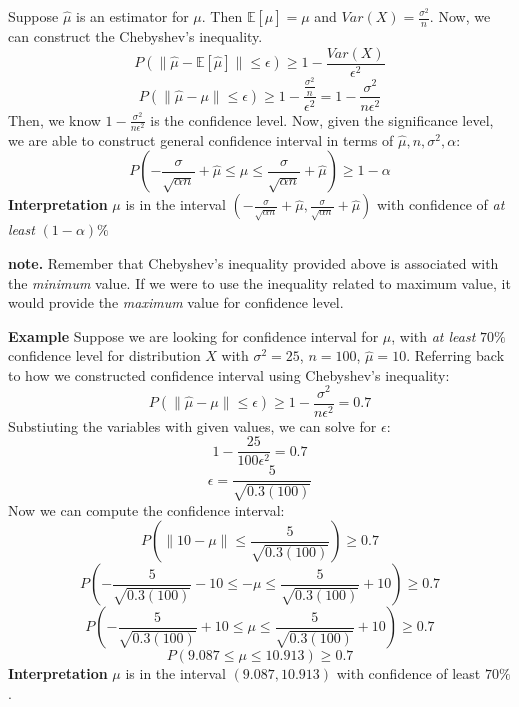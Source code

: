 \documentclass[a4paper]{article}
\begin{document}
\begin{mdframed}[]
    Suppose $\hat{\mu}$ is an estimator for ${\mu}$. Then $\mathbb{E}[\hat{\mu}] = \mu$ and $Var(X) = \frac{\sigma^2}{n}$. Now, we can construct the Chebyshev's inequality.
    $$P(\|\hat{\mu}-\mathbb{E}[\hat\mu]\| \le \epsilon) \ge 1-\frac{Var(X)}{\epsilon^2}$$
    $$P(\|\hat{\mu}-\mu\| \le \epsilon) \ge 1-\frac{\frac{\sigma^2}{n}}{\epsilon^2}=1-\frac{\sigma^2}{n\epsilon^2}$$
    Then, we know $1-\frac{\sigma^2}{n\epsilon^2}$ is the confidence level.
    Now, given the significance level, we are able to construct general confidence interval in terms of $\hat{\mu}, n, \sigma^2,\alpha$:
    $$P(-\frac{\sigma}{\sqrt{\alpha n}}+\hat{\mu}\le\mu\le\frac{\sigma}{\sqrt{\alpha n}}+\hat{\mu})\ge 1-\alpha$$
    \newline
    \textbf{Interpretation}
    \newline
    $\mu$ is in the interval $(-\frac{\sigma}{\sqrt{\alpha n}}+\hat{\mu}, \frac{\sigma}{\sqrt{\alpha n}}+\hat{\mu})$ with confidence of \textit{at least} $(1-\alpha)\%$
    \newline
\end{mdframed}
\textbf{note.} 
\newline
Remember that Chebyshev's inequality provided above is associated with the \textit{minimum} value.
\newline
If we were to use the inequality related to maximum value, it would provide the \textit{maximum} value for confidence level.
\begin{mdframed}[]
    \textbf{Example}
    \newline
    Suppose we are looking for confidence interval for $\mu$, with \textit{at least} $70\%$ confidence level for distribution $X$ with $\sigma^2=25$, $n=100$, $\hat{\mu}=10$.
    \newline
    Referring back to how we constructed confidence interval using Chebyshev's inequality:
    $$P(\|\hat{\mu}-\mu\| \le \epsilon)\ge1-\frac{\sigma^2}{n\epsilon^2}=0.7$$
    Substiuting the variables with given values, we can solve for $\epsilon$:
    $$1-\frac{25}{100\epsilon^2}=0.7$$
    $$\epsilon = \frac{5}{\sqrt{0.3(100)}}$$
    Now we can compute the confidence interval:
    $$P(\|10-\mu\| \le \frac{5}{\sqrt{0.3(100)}})\ge0.7$$
    $$P(-\frac{5}{\sqrt{0.3(100)}}-10\le -\mu \le \frac{5}{\sqrt{0.3(100)}}+10) \ge 0.7$$
    $$P(-\frac{5}{\sqrt{0.3(100)}}+10\le \mu \le \frac{5}{\sqrt{0.3(100)}}+10) \ge 0.7$$
    $$P(9.087\le \mu \le 10.913) \ge 0.7$$
    \textbf{Interpretation}
    \newline
    $\mu$ is in the interval $(9.087, 10.913)$ with confidence of least $70\%$.

\end{mdframed}
\end{document}
